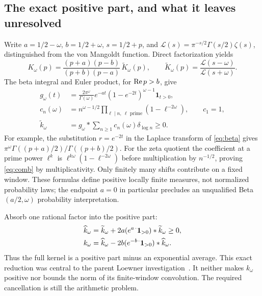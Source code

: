 \subsection{The exact positive part, and what it leaves unresolved}

Write $a=1/2-\omega$, $b=1/2+\omega$, $s=1/2+p$, and
$\mathcal L(s)=\pi^{-s/2}\Gamma(s/2)\zeta(s)$, distinguished from the
von Mangoldt function. Direct factorization yields
\begin{equation}\label{eq:factor}
 K_\omega(p)=\frac{(p+a)(p-b)}{(p+b)(p-a)}\,
 \widetilde K_\omega(p),\qquad
 \widetilde K_\omega(p)=\frac{\mathcal L(s-\omega)}{\mathcal L(s+\omega)}.
\end{equation}
The beta integral and Euler product, for $\operatorname{Re} p>b$, give
\begin{align}
 g_\omega(t)&=\frac{2\pi^\omega}{\Gamma(\omega)}
 e^{-a t}(1-e^{-2t})^{\omega-1}\mathbf1_{t>0},\label{eq:beta}\\
 c_n(\omega)&=n^{\omega-1/2}\prod_{\ell\mid n,\ \ell\text{ prime}}
 (1-\ell^{-2\omega}),\qquad c_1=1,\label{eq:comb}\\
 \widetilde k_\omega&=g_\omega*\sum_{n\geq1}c_n(\omega)\delta_{\log n}\geq0.
 \label{eq:positive-part}
\end{align}
For example, the substitution $r=e^{-2t}$ in the Laplace transform of
\eqref{eq:beta} gives
$\pi^\omega\Gamma((p+a)/2)/\Gamma((p+b)/2)$.
For the zeta quotient the coefficient at a prime power $\ell^k$ is
$\ell^{k\omega}(1-\ell^{-2\omega})$ before multiplication by
$n^{-1/2}$, proving \eqref{eq:comb} by multiplicativity.
Only finitely many shifts contribute on a fixed window. These formulas
define positive locally finite measures, not normalized probability
laws; the endpoint $a=0$ in particular precludes an unqualified
Beta$(a/2,\omega)$ probability interpretation.

Absorb one rational factor into the positive part:
\begin{align}
 \widehat k_\omega
 &=\widetilde k_\omega+2a(e^{a\,\cdot}\mathbf1_{>0})*
 \widetilde k_\omega\geq0,\notag\\
 k_\omega&=\widehat k_\omega
 -2b(e^{-b\,\cdot}\mathbf1_{>0})*\widehat k_\omega.
 \label{eq:rational-subtraction}
\end{align}
Thus the full kernel is a positive part minus an exponential average.
This exact reduction was central to the parent Loewner
investigation~\cite{ParentLoewner}. It neither makes $k_\omega$ positive
nor bounds the norm of its finite-window convolution. The required
cancellation is still the arithmetic problem.

